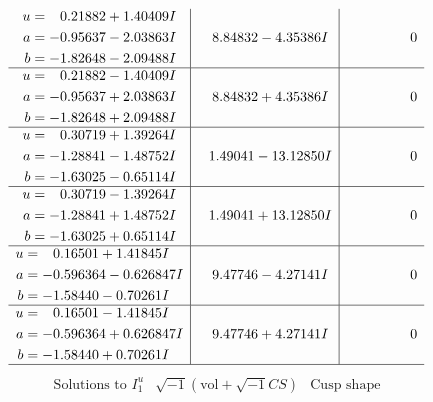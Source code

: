 \documentclass[1p]{elsarticle_modified}
\theoremstyle{definition}
\newcommand{\I}{\sqrt{-1}}
\begin{document}
$$\begin{array}{c|c|c}
\begin{aligned}
u &= \phantom{-}0.21882 + 1.40409 I \\
a &= -0.95637 - 2.03863 I \\
b &= -1.82648 - 2.09488 I\end{aligned}
 & \phantom{-}8.84832 - 4.35386 I & \phantom{-0.000000 } 0 \\ \hline\begin{aligned}
u &= \phantom{-}0.21882 - 1.40409 I \\
a &= -0.95637 + 2.03863 I \\
b &= -1.82648 + 2.09488 I\end{aligned}
 & \phantom{-}8.84832 + 4.35386 I & \phantom{-0.000000 } 0 \\ \hline\begin{aligned}
u &= \phantom{-}0.30719 + 1.39264 I \\
a &= -1.28841 - 1.48752 I \\
b &= -1.63025 - 0.65114 I\end{aligned}
 & \phantom{-}1.49041 - 13.12850 I & \phantom{-0.000000 } 0 \\ \hline\begin{aligned}
u &= \phantom{-}0.30719 - 1.39264 I \\
a &= -1.28841 + 1.48752 I \\
b &= -1.63025 + 0.65114 I\end{aligned}
 & \phantom{-}1.49041 + 13.12850 I & \phantom{-0.000000 } 0 \\ \hline\begin{aligned}
u &= \phantom{-}0.16501 + 1.41845 I \\
a &= -0.596364 - 0.626847 I \\
b &= -1.58440 - 0.70261 I\end{aligned}
 & \phantom{-}9.47746 - 4.27141 I & \phantom{-0.000000 } 0 \\ \hline\begin{aligned}
u &= \phantom{-}0.16501 - 1.41845 I \\
a &= -0.596364 + 0.626847 I \\
b &= -1.58440 + 0.70261 I\end{aligned}
 & \phantom{-}9.47746 + 4.27141 I & \phantom{-0.000000 } 0\\
 \hline 
 \end{array}$$\newpage$$\begin{array}{c|c|c}  
\text{Solutions to }I^u_{1}& \I (\text{vol} + \sqrt{-1}CS) & \text{Cusp shape}\\
 \hline 
\begin{aligned}

\end{aligned}
\end{array}$$
\end{document}
